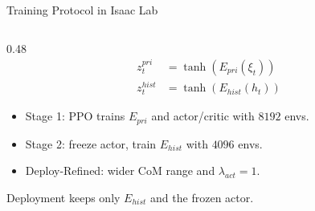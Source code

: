 \documentclass{beamer}
\begin{document}
\begin{frame}{Training Protocol in Isaac Lab}
\begin{columns}[T,onlytextwidth]
\begin{column}{0.48\textwidth}
            \vspace{0.35em}
            \[
                \begin{aligned}
                    z_t^{pri}  &= \tanh(E_{pri}(\xi_t)) \\
                    z_t^{hist} &= \tanh(E_{hist}(h_t))
                \end{aligned}
            \]

            \vspace{-0.25em}
            \begin{itemize}
                \item Stage 1: PPO trains $E_{pri}$ and actor/critic with $8192$ envs.
                \item Stage 2: freeze actor, train $E_{hist}$ with $4096$ envs.
                \item Deploy-Refined: wider CoM range and $\lambda_{act}=1$.
            \end{itemize}

            \vspace{0.15em}
            \centering
            \scriptsize
            Deployment keeps only $E_{hist}$ and the frozen actor.
        \end{column}
    \end{columns}
\end{frame}
\end{document}
